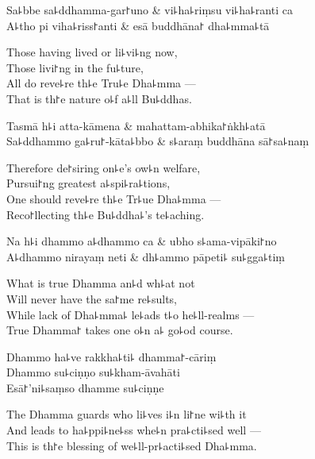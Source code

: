 \begin{twochants}
  Sa꜕bbe sa꜕ddhamma-gar꜓uno & vi꜕ha꜕riṃsu vi꜕ha꜕ranti ca \\
  A꜕tho pi viha꜕riss꜓anti & esā buddhāna꜓ dha꜕mma꜕tā \\
\end{twochants}

\begin{english}
  Those having lived or li꜕vi꜕ng now,\\
  Those livi꜓ng in the fu꜕ture,\\
  All do reve꜕re th꜕e Tru꜕e Dha꜕mma ---\\
  That is th꜓e nature o꜕f a꜕ll Bu꜕ddhas.
\end{english}

\begin{twochants}
  Tasmā h꜕i atta-kāmena & mahattam-abhika꜓ṅkh꜕atā \\
  Sa꜕ddhammo ga꜕ru꜓-kāta꜕bbo & s꜕araṃ buddhāna sā꜓sa꜕naṃ \\
\end{twochants}

\begin{english}
  Therefore de꜓siring on꜕e's ow꜕n welfare,\\
  Pursui꜓ng greatest a꜕spi꜕ra꜕tions,\\
  One should reve꜕re th꜕e Tr꜕ue Dha꜕mma ---\\
  Reco꜓llecting th꜕e Bu꜕ddha꜕'s te꜕aching.
\end{english}

\begin{twochants}
  Na h꜕i dhammo a꜕dhammo ca & ubho s꜕ama-vipāki꜓no \\
  A꜕dhammo nirayaṃ neti & dh꜕ammo pāpeti꜕ su꜕gga꜕tiṃ \\
\end{twochants}

\begin{english}
  What is true Dhamma an꜕d wh꜕at not\\
  Will never have the sa꜓me re꜕sults,\\
  While lack of Dha꜕mma꜕ le꜕ads t꜕o he꜕ll-realms ---\\
  True Dhamma꜓ takes one o꜕n a꜕ go꜕od course.
\end{english}

Dhammo ha꜕ve rakkha꜕ti꜕ dhamma꜓-cāriṃ\\
Dhammo su꜕ciṇṇo su꜕kham-āvahāti\\
Esā꜓'ni꜕saṃso dhamme su꜕ciṇṇe

\begin{english}
  The Dhamma guards who li꜕ves i꜕n li꜓ne wi꜕th it\\
  And leads to ha꜕ppi꜕ne꜕ss whe꜕n pra꜕cti꜕sed well ---\\
  This is th꜓e blessing of we꜕ll-pr꜕acti꜕sed Dha꜕mma.
\end{english}

